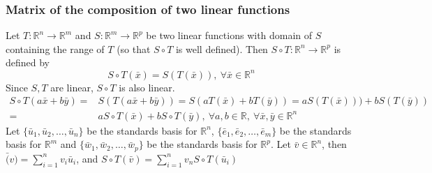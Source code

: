 \subsubsection{Matrix of the composition of two linear functions}
Let $T : \mathbb{R}^n \to \mathbb{R}^m$ and $S : \mathbb{R}^m \to \mathbb{R}^p$ be two linear functions with domain of $S$ containing the range of $T$ (so that $S \circ T$ is well defined).
Then $S \circ T : \mathbb{R}^n \to \mathbb{R}^p$ is defined by
\[ S \circ T(\bar{x}) = S(T(\bar{x})),\ \forall \bar{x} \in \mathbb{R}^n\]
Since $S,T$ are linear, $S \circ T$ is also linear.
\begin{align*}
	S \circ T(a \bar{x} + b \bar{y}) = & S(T(a \bar{x} + b\bar{y})) = S(a T(\bar{x}) + b T(\bar{y})) = a S(T(\bar{x}))) + b S(T(\bar{y})) \\
	= & a S \circ T(\bar{x}) + b S \circ T(\bar{y}),\ \forall a,b \in \mathbb{R},\ \forall \bar{x},\bar{y} \in \mathbb{R}^n
\end{align*}
Let $\{\bar{u}_1,\bar{u}_2,\dots,\bar{u}_n\}$ be the standards basis for $\mathbb{R}^n$, $\{\bar{e}_1,\bar{e}_2,\dots,\bar{e}_m\}$ be the standards basis for $\mathbb{R}^m$ and $\{\bar{w}_1,\bar{w}_2,\dots,\bar{w}_p\}$ be the standards basis for $\mathbb{R}^p$.
Let $\bar{v} \in \mathbb{R}^n$, then $\bar(v) = \sum_{i=1}^n v_i\bar{u}_i$, and $S \circ T(\bar{v})=\sum_{i=1}^n v_n S \circ T(\bar{u}_i)$
